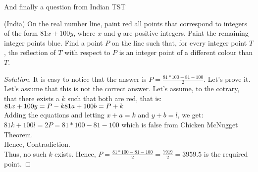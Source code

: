 And finally a question from Indian TST\\
\begin{example}
(India) On the real number line, paint red all points that correspond to integers of the form $81x+100y$, where $x$ and $y$ are positive integers. Paint the remaining integer points blue. Find a point $P$ on the line such that, for every integer point $T$, the reflection of $T$ with respect to $P$ is an integer point of a different colour than $T$.
\end{example}
\begin{proof}
    [Solution]
    It is easy to notice that the answer is $P=\frac{81*100-81-100}{2}$. Let's prove it.\\
    Let's assume that this is not the correct answer. Let's assume, to the cotrary, that there exists a $k$ such that both are red, that is:\\
    $81x+100y=P-k\\
    81a+100b=P+k$\\
    Adding the equations and letting $x+a=k$ and $y+b=l$, we get:\\
    $81k+100l=2P=81*100-81-100$ which is false from Chicken McNugget Theorem.\\
    Hence, Contradiction.\\
    Thus, no such $k$ exists. Hence, $P=\frac{81*100-81-100}{2}=\frac{7919}{2}=3959.5$ is the required point.
\end{proof}
